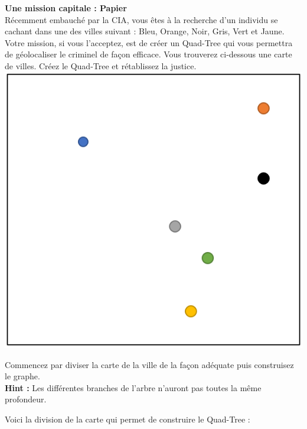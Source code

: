 \begin{Exercice}[10 minutes]\textbf{Une mission capitale : Papier}\\

Récemment embauché par la CIA, vous êtes à la recherche d'un individu se cachant dans une des villes suivant : Bleu, Orange, Noir, Gris, Vert et Jaune. Votre mission, si vous l'acceptez, est de créer un Quad-Tree qui vous permettra de géolocaliser le criminel de façon efficace. Vous trouverez ci-dessous une carte de villes. Créez le Quad-Tree et rétablissez la justice.\\

\includegraphics[]{Quad-Tree 3.PNG}
\begin{conseil}
    Commencez par diviser la carte de la ville de la façon adéquate puis construisez le graphe.\\
    
    \textbf{Hint : }Les différentes branches de l'arbre n'auront pas toutes la même profondeur.
\end{conseil}
\begin{solution}
    Voici la division de la carte qui permet de construire le Quad-Tree :\\
    

\end{solution}
\end{Exercice}
